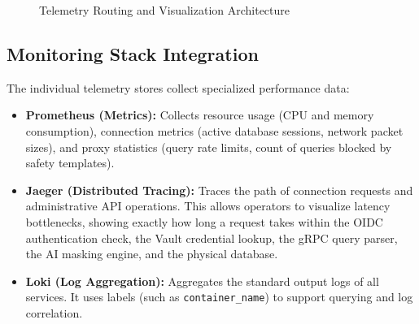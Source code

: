 \begin{figure}[H]
    \centering
    \caption{Telemetry Routing and Visualization Architecture}
    \label{fig:observability-architecture}
\end{figure}

\subsection{Monitoring Stack Integration}
The individual telemetry stores collect specialized performance data:
\begin{itemize}
    \item \textbf{Prometheus (Metrics):} Collects resource usage (CPU and memory consumption), connection metrics (active database sessions, network packet sizes), and proxy statistics (query rate limits, count of queries blocked by safety templates).
    \item \textbf{Jaeger (Distributed Tracing):} Traces the path of connection requests and administrative API operations. This allows operators to visualize latency bottlenecks, showing exactly how long a request takes within the OIDC authentication check, the Vault credential lookup, the gRPC query parser, the AI masking engine, and the physical database.
    \item \textbf{Loki (Log Aggregation):} Aggregates the standard output logs of all services. It uses labels (such as \texttt{container\_name}) to support querying and log correlation.
\end{itemize}

